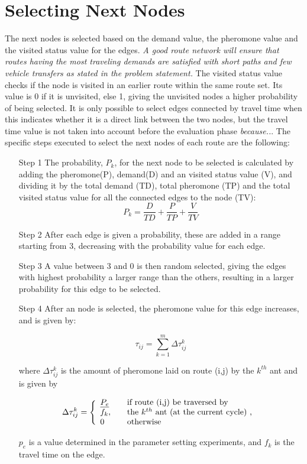 \section{Selecting Next Nodes}
The next nodes is selected based on the demand value, the pheromone value and the visited status value for the edges. \emph{\color{red} A good route network will ensure that routes having the most traveling demands are satisfied with short paths and few vehicle transfers as stated in the problem statement.} The visited status value checks if the node is visited in an earlier route within the same route set. Its value is 0 if it is unvisited, else 1, giving the unvisited nodes a higher probability of being selected. It is only possible to select edges connected by travel time when this indicates whether it is a direct link between the two nodes, but the travel time value is not taken into account before the evaluation phase \emph{\color{red} because..}.  %
The specific steps executed to select the next nodes of each route are the following:
\begin{itemize}
\item[Step 1] The probability, $P_k$, for the next node to be selected is calculated by adding the pheromone(P), demand(D) and an visited status value (V), and dividing it by the total demand (TD), total pheromone (TP) and the total visited status value for all the connected edges to the node (TV):
$$ P_{k} = \frac{D}{TD} + \frac{P}{TP} + \frac{V}{TV}$$ 

\item[Step 2] After each edge is given a probability, these are added in a range starting from 3, decreasing with the probability value for each edge. 
\item[Step 3] A value between 3 and 0 is then random selected, giving the edges with highest probability a larger range than the others, resulting in a larger probability for this edge to be selected. 
\item[Step 4] After an node is selected, the pheromone value for this edge increases, and is given by:

$$ \tau_{ij} = \sum_{k=1}^{m} \Delta \tau^k_{ij}$$

where $ \Delta \tau^k_{ij} $ is the amount of pheromone laid on route (i,j) by the $k^{th}$ ant and is given by

$$
\Delta \tau^k_{ij} = \Bigg\{
\begin{array}{l l}
\underline{P_{e}} &  \quad \text{if route (i,j) be traversed by}\\
f_k, &  \quad \text{the $k^{th}$ ant (at the current cycle) , }\\
0 &  \quad \text{otherwise}
\end{array}
$$

$p_e$ is a value determined in the parameter setting experiments, and $f_k$ is the travel time on the edge. 
\end{itemize}